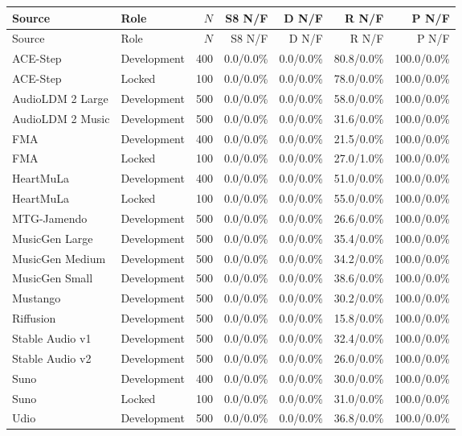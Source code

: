 \begin{longtable}{llrrrrr}
\toprule
Source & Role & $N$ & S8 N/F & D N/F & R N/F & P N/F \\
\midrule
\endfirsthead
\toprule
Source & Role & $N$ & S8 N/F & D N/F & R N/F & P N/F \\
\midrule
\endhead
ACE-Step & Development & 400 & 0.0/0.0\% & 0.0/0.0\% & 80.8/0.0\% & 100.0/0.0\% \\
ACE-Step & Locked & 100 & 0.0/0.0\% & 0.0/0.0\% & 78.0/0.0\% & 100.0/0.0\% \\
AudioLDM 2 Large & Development & 500 & 0.0/0.0\% & 0.0/0.0\% & 58.0/0.0\% & 100.0/0.0\% \\
AudioLDM 2 Music & Development & 500 & 0.0/0.0\% & 0.0/0.0\% & 31.6/0.0\% & 100.0/0.0\% \\
FMA & Development & 400 & 0.0/0.0\% & 0.0/0.0\% & 21.5/0.0\% & 100.0/0.0\% \\
FMA & Locked & 100 & 0.0/0.0\% & 0.0/0.0\% & 27.0/1.0\% & 100.0/0.0\% \\
HeartMuLa & Development & 400 & 0.0/0.0\% & 0.0/0.0\% & 51.0/0.0\% & 100.0/0.0\% \\
HeartMuLa & Locked & 100 & 0.0/0.0\% & 0.0/0.0\% & 55.0/0.0\% & 100.0/0.0\% \\
MTG-Jamendo & Development & 500 & 0.0/0.0\% & 0.0/0.0\% & 26.6/0.0\% & 100.0/0.0\% \\
MusicGen Large & Development & 500 & 0.0/0.0\% & 0.0/0.0\% & 35.4/0.0\% & 100.0/0.0\% \\
MusicGen Medium & Development & 500 & 0.0/0.0\% & 0.0/0.0\% & 34.2/0.0\% & 100.0/0.0\% \\
MusicGen Small & Development & 500 & 0.0/0.0\% & 0.0/0.0\% & 38.6/0.0\% & 100.0/0.0\% \\
Mustango & Development & 500 & 0.0/0.0\% & 0.0/0.0\% & 30.2/0.0\% & 100.0/0.0\% \\
Riffusion & Development & 500 & 0.0/0.0\% & 0.0/0.0\% & 15.8/0.0\% & 100.0/0.0\% \\
Stable Audio v1 & Development & 500 & 0.0/0.0\% & 0.0/0.0\% & 32.4/0.0\% & 100.0/0.0\% \\
Stable Audio v2 & Development & 500 & 0.0/0.0\% & 0.0/0.0\% & 26.0/0.0\% & 100.0/0.0\% \\
Suno & Development & 400 & 0.0/0.0\% & 0.0/0.0\% & 30.0/0.0\% & 100.0/0.0\% \\
Suno & Locked & 100 & 0.0/0.0\% & 0.0/0.0\% & 31.0/0.0\% & 100.0/0.0\% \\
Udio & Development & 500 & 0.0/0.0\% & 0.0/0.0\% & 36.8/0.0\% & 100.0/0.0\% \\

\end{longtable}
